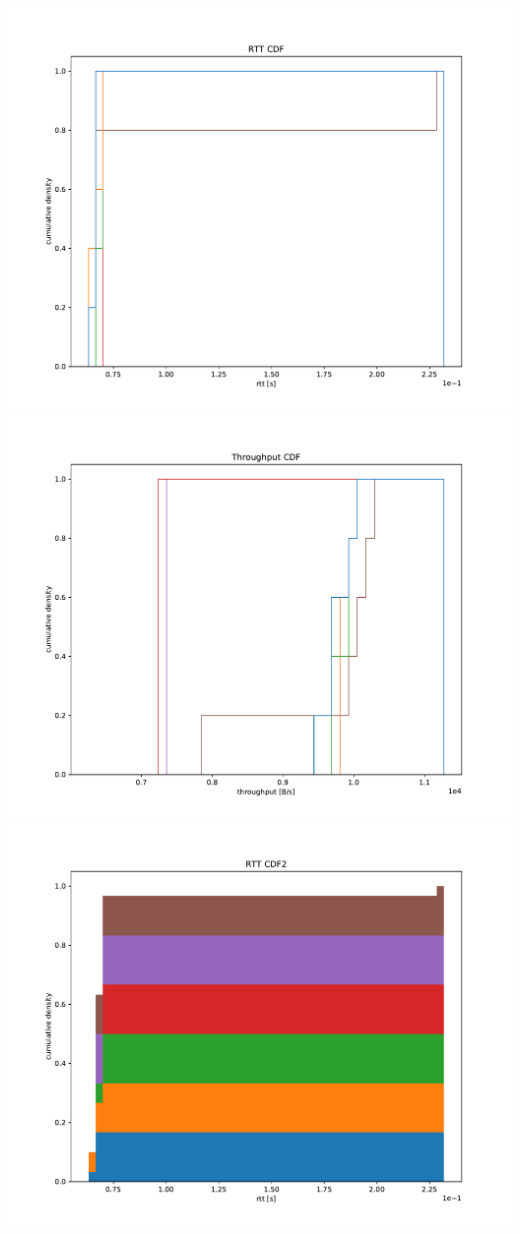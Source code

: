 \documentclass{article}
\begin{document}
	\includegraphics[width=\textwidth]{cdf/rtt_cdf}
	\includegraphics[width=\textwidth]{cdf/throughput_cdf}
	\includegraphics[width=\textwidth]{cdf2/rtt_cdf2}
\end{document}
